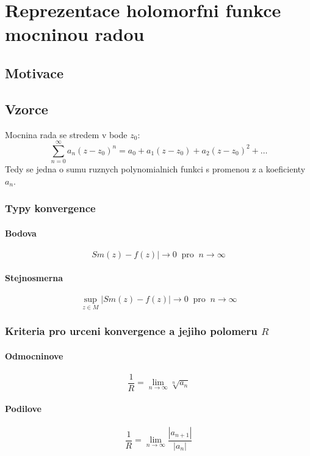 \chapter{Reprezentace holomorfni funkce mocninou radou}

\section{Motivace}

\section{Vzorce}
Mocnina rada se stredem v bode $z_0$:
$$\sum_{n=0}^\infty a_n (z-z_0)^n = a_0 + a_1 (z-z_0) +a_2 (z-z_0)^2 + \dots$$
Tedy se jedna o sumu ruznych polynomialnich funkci s promenou z a koeficienty $a_n$.

\subsection{Typy konvergence}
\subsubsection*{Bodova}
\begin{equation}
\label{eq:bod_kon}
Sm(z)-f(z)| \to 0 \; \operatorname{pro} \; n \to \infty
\end{equation} 

\subsubsection*{Stejnosmerna}
\begin{equation}
\label{eq:ste_kon}
\operatorname{sup}_{z \in M} |Sm(z)-f(z)| \to 0 \; \operatorname{pro} \; n \to \infty
\end{equation}

\subsection{Kriteria pro urceni konvergence a jejiho polomeru $R$}

\subsubsection*{Odmocninove}
\begin{equation}
\label{eq:odm}
\frac{1}{R} = \lim_{n \to \infty} \sqrt[n]{a_n}
\end{equation}
\subsubsection*{Podilove}
\begin{equation}
\label{eq:pod}
\frac{1}{R} = \lim_{n \to \infty} \frac{|a_{n+1}|}{|a_n|}
\end{equation}

